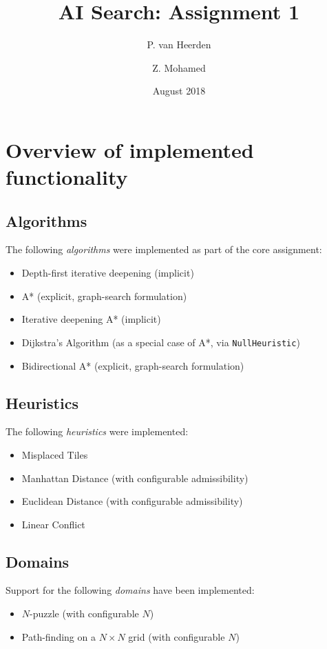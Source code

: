 \documentclass{article}
\title{AI Search: Assignment 1}
\author{P. van Heerden\and Z. Mohamed}
\date{August 2018}
\begin{document}
\maketitle

\tableofcontents

\section{Overview of implemented functionality}
\subsection{Algorithms}
The following \emph{algorithms} were implemented as part of the core assignment:
\begin{itemize}
    \item Depth-first iterative deepening (implicit)
    \item A* (explicit, graph-search formulation)
    \item Iterative deepening A* (implicit)
    \item Dijkstra's Algorithm (as a special case of A*, via \texttt{NullHeuristic})
    \item Bidirectional A* (explicit, graph-search formulation)
\end{itemize}
\subsection{Heuristics}\label{section:heuristics}
The following \emph{heuristics} were implemented:
\begin{itemize}
    \item Misplaced Tiles
    \item Manhattan Distance (with configurable admissibility)
    \item Euclidean Distance (with configurable admissibility)
    \item Linear Conflict
\end{itemize}
\subsection{Domains}
Support for the following \emph{domains} have been implemented:
\begin{itemize}
    \item $N$-puzzle (with configurable $N$)
    \item Path-finding on a $N\times N$ grid (with configurable $N$)
\end{itemize}
\end{document}
